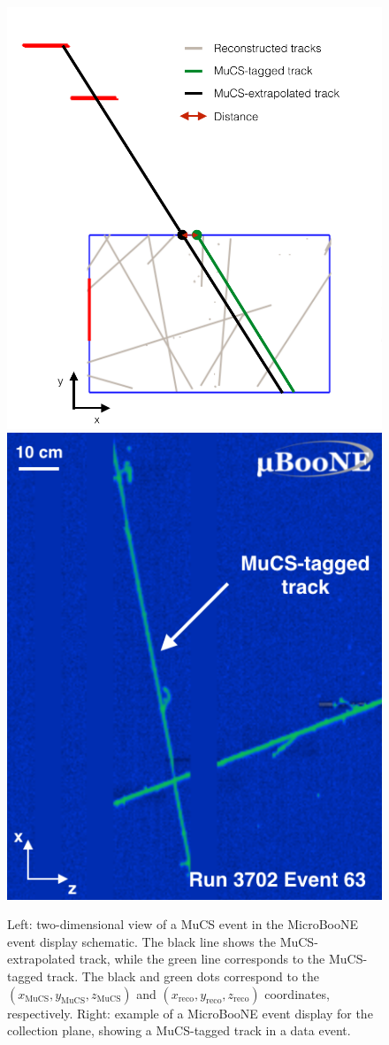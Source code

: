 \documentclass[a4paper,11pt]{article}
\begin{document}
\begin{figure}[htbp]
  \begin{center}
  \includegraphics[width=0.50\linewidth]{figures/evd.pdf}
  \includegraphics[width=0.40\linewidth]{figures/evd_display.png}

  \caption{Left: two-dimensional view of a MuCS event in the MicroBooNE event display schematic. The black line shows the MuCS-extrapolated track, while the green line corresponds to the MuCS-tagged track. The black and green dots correspond to the $(x_{\mathrm{MuCS}},y_{\mathrm{MuCS}},z_{\mathrm{MuCS}})$ and $(x_{\mathrm{reco}},y_{\mathrm{reco}},z_{\mathrm{reco}})$ coordinates, respectively. Right: example of a MicroBooNE event display for the collection plane, showing a MuCS-tagged track in a data event.} \label{fig:evd}
\end{center}
\end{figure}
\end{document}
